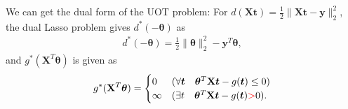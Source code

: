 \documentclass[twoside]{article}
\theoremstyle{plain}
\newcommand{\tranT}{T}
\newcommand{\mat}[1]{\mathbf{#1}}
\renewcommand{\vec}[1]{\bm{#1}}
\newcommand{\changeHK}[1]{\textcolor{red}{#1}}
\begin{document}
We can get the dual form of the UOT problem: 
For $d(\mat{X} \vec{t}) = \frac{1}{2}\|\mat{X} \vec{t}-\vec{y}\|_2^2$, the dual Lasso problem gives $d^*(-\vec{\theta})$ as
 \begin{equation}
\begin{split} 
d^*(-\vec{\theta}) = \frac{1}{2}\|\vec{\theta}\|_2^2-{\vec{y}^T\vec{\theta}},
 \end{split}
\end{equation}
and  $g^*(\mat{X}^{\tranT}\vec{\theta})$ is given as
 \begin{equation*}
\begin{split} 
g^*(\mat{X}^{\tranT}\vec{\theta}) = 
\begin{cases}
0 & (\forall \vec{t} \quad\vec{\theta}^{\tranT}\mat{X}\vec{t} - g(\vec{t}) \leq 0 )\\
\infty &( \exists t \quad\vec{\theta}^{\tranT}\mat{X}\vec{t} - g(\vec{t}) \changeHK{>} 0 ).
\end{cases}
 \end{split}
\end{equation*}
\end{document}
